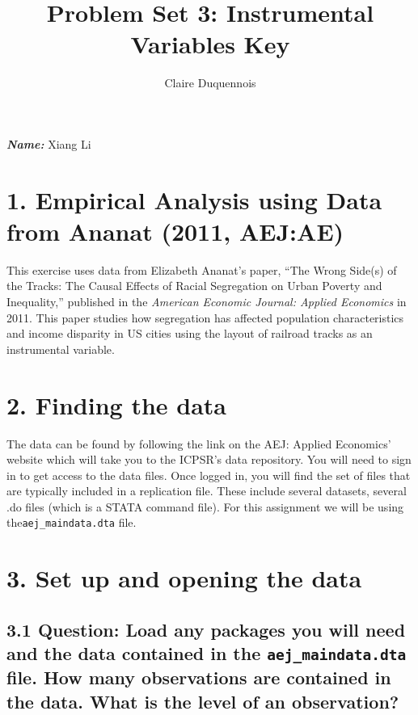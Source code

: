 \documentclass[
]{article}
\title{Problem Set 3: Instrumental Variables Key}
\author{Claire Duquennois}
\date{}
\begin{document}
\maketitle

\textbf{\emph{Name: }} Xiang Li

\hypertarget{empirical-analysis-using-data-from-ananat-2011-aejae}{%
\section{1. Empirical Analysis using Data from Ananat (2011,
AEJ:AE)}\label{empirical-analysis-using-data-from-ananat-2011-aejae}}

This exercise uses data from Elizabeth Ananat's paper, ``The Wrong
Side(s) of the Tracks: The Causal Effects of Racial Segregation on Urban
Poverty and Inequality,'' published in the \emph{American Economic
Journal: Applied Economics} in 2011. This paper studies how segregation
has affected population characteristics and income disparity in US
cities using the layout of railroad tracks as an instrumental variable.

\hypertarget{finding-the-data}{%
\section{2. Finding the data}\label{finding-the-data}}

The data can be found by following the link on the AEJ: Applied
Economics' website which will take you to the ICPSR's data repository.
You will need to sign in to get access to the data files. Once logged
in, you will find the set of files that are typically included in a
replication file. These include several datasets, several .do files
(which is a STATA command file). For this assignment we will be using
the\texttt{aej\_maindata.dta} file.

\clearpage

\hypertarget{set-up-and-opening-the-data}{%
\section{3. Set up and opening the
data}\label{set-up-and-opening-the-data}}

\hypertarget{question-load-any-packages-you-will-need-and-the-data-contained-in-the-aej_maindata.dta-file.-how-many-observations-are-contained-in-the-data.-what-is-the-level-of-an-observation}{%
\subsection{\texorpdfstring{3.1 Question: Load any packages you will
need and the data contained in the \texttt{aej\_maindata.dta} file. How
many observations are contained in the data. What is the level of an
observation?}{3.1 Question: Load any packages you will need and the data contained in the aej\_maindata.dta file. How many observations are contained in the data. What is the level of an observation?}}\label{question-load-any-packages-you-will-need-and-the-data-contained-in-the-aej_maindata.dta-file.-how-many-observations-are-contained-in-the-data.-what-is-the-level-of-an-observation}}
\end{document}
